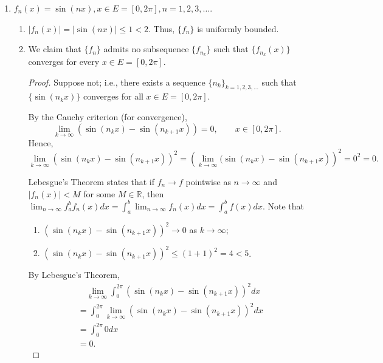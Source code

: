 \documentclass[letterpaper, reqno,11pt]{article}
\newcommand{\RR}{\mathbb{R}}
\begin{document}
\begin{enumerate}
\item $f_n(x) = \sin(nx), x \in E = [0, 2 \pi], n = 1, 2, 3, \ldots$.
  \begin{enumerate}
  \item $|f_n(x)| = |\sin(nx)| \leq 1 < 2$. Thus, $\{ f_n \}$ is uniformly bounded.
  \item We claim that $\{ f_n \}$ admits no subsequence $\{ f_{n_k} \}$ such that $\{ f_{n_k}(x) \}$ converges for every $x \in E = [0, 2\pi]$.
    \begin{proof}
      Suppose not; i.e., there exists a sequence $\{ n_k \}_{k = 1,2 , 3, \ldots}$ such that $\{ \sin(n_k x) \}$ converges for all $x \in E = [0, 2\pi]$.

      By the Cauchy criterion (for convergence),
      $$ \lim_{k \to \infty} (\sin(n_k x) - \sin(n_{k + 1} x)) = 0, \qquad x \in [0, 2\pi]. $$
      Hence,
      $$ \lim_{k \to \infty} (\sin(n_k x) - \sin(n_{k + 1} x))^2 = \left(\lim_{k \to \infty} (\sin(n_k x) - \sin(n_{k + 1} x)\right)^2 = 0^2 = 0. $$
      
      Lebesgue's Theorem states that if $f_n \to f$ pointwise as $n \to \infty$ and $|f_n(x)| < M$ for some $M \in \RR$, then $\lim_{n \to \infty} f_a^b f_n(x) dx = \int_a^b \lim_{n \to \infty} f_n(x) dx = \int_a^b f(x) dx$. Note that
      \begin{enumerate}
      \item $(\sin(n_k x) - \sin(n_{k + 1} x))^2 \to 0$ as $k \to \infty$;
      \item $(\sin(n_k x) - \sin(n_{k + 1} x))^2 \leq (1 + 1)^2 = 4 < 5$.
      \end{enumerate}
      By Lebesgue's Theorem,
      \begin{equation}\label{eq:1}
        \begin{split}
          & \quad \lim_{k \to \infty} \int_0^{2\pi} (\sin(n_k x) - \sin(n_{k + 1} x))^2 dx \\
          &= \int_0^{2\pi} \lim_{k \to \infty} (\sin(n_k x) - \sin(n_{k + 1} x))^2 dx \\
          &= \int_0^{2\pi} 0 dx \\
          &= 0.
        \end{split}
      \end{equation}


\end{proof}
\end{enumerate}
\end{enumerate}
\end{document}
